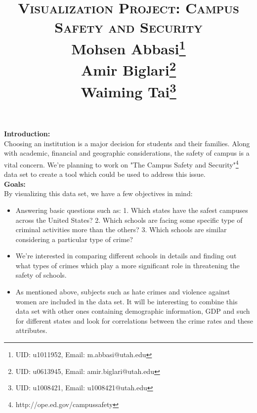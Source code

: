 \setlength{\oddsidemargin}{0in}
\setlength{\evensidemargin}{0in}
\setlength{\textwidth}{6.5in}
\setlength{\topmargin}{-.3in}
\setlength{\textheight}{9in}
\pagestyle{empty}

\title{	
\normalfont \Large 
\textsc{Visualization Project: Campus Safety and Security} \\ [10pt] %
Mohsen Abbasi\footnote{UID: u1011952, Email: m.abbasi@utah.edu} \\ %
Amir Biglari\footnote{UID: u0613945, Email: amir.biglari@utah.edu}\\
Waiming Tai\footnote{UID: u1008421, Email: u1008421@utah.edu}
}





\maketitle
\noindent
\textbf{Introduction:}\\
Choosing an institution is a major decision for students and their families. Along with academic, financial and 
geographic considerations, the safety of campus is a vital concern. We're planning to work on "The Campus Safety and Security"\footnote{http://ope.ed.gov/campussafety} data set to create a tool which could be used to address this issue.\\ 

\noindent
\textbf{Goals:}\\
By visualizing this data set, we have a few objectives in mind:
\begin{itemize}
\item Answering basic questions such as: 1. Which states have the safest campuses across the United States? 2. Which schools are facing some specific type of criminal activities more than the others? 3. Which schools are similar considering a particular type of crime?   
\item We're interested in comparing different schools in details and finding out what types of crimes which play a more significant role in threatening the safety of schools.
\item As mentioned above, subjects such as hate crimes and violence against women are included in the data set. It will be interesting to combine this data set with other ones containing demographic information, GDP and such for different states and look for correlations between the crime rates and these attributes. 
\end{itemize}

